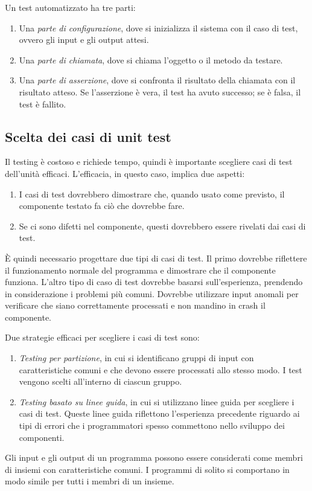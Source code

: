 Un test automatizzato ha tre parti:
\begin{enumerate}
    \item Una \textit{parte di configurazione}, dove si inizializza il sistema con il caso di test, ovvero gli input e gli output attesi.
    \item Una \textit{parte di chiamata}, dove si chiama l'oggetto o il metodo da testare.
    \item Una \textit{parte di asserzione}, dove si confronta il risultato della chiamata con il risultato atteso. Se l’asserzione è vera, il test ha avuto successo; se è falsa, il test è fallito.
\end{enumerate}

\subsection{Scelta dei casi di unit test}
Il testing è costoso e richiede tempo, quindi è importante scegliere casi di test dell’unità efficaci. L'efficacia, in questo caso, implica due aspetti:
\begin{enumerate}
    \item I casi di test dovrebbero dimostrare che, quando usato come previsto, il componente testato fa ciò che dovrebbe fare.
    \item Se ci sono difetti nel componente, questi dovrebbero essere rivelati dai casi di test.
\end{enumerate}
È quindi necessario progettare due tipi di casi di test. Il primo dovrebbe riflettere il funzionamento normale del programma e dimostrare che il componente funziona. L’altro tipo di caso di test dovrebbe basarsi sull’esperienza, prendendo in considerazione i problemi più comuni. Dovrebbe utilizzare input anomali per verificare che siano correttamente processati e non mandino in crash il componente.

Due strategie efficaci per scegliere i casi di test sono:
\begin{enumerate}
    \item \textit{Testing per partizione}, in cui si identificano gruppi di input con caratteristiche comuni e che devono essere processati allo stesso modo. I test vengono scelti all'interno di ciascun gruppo.
    \item \textit{Testing basato su linee guida}, in cui si utilizzano linee guida per scegliere i casi di test. Queste linee guida riflettono l’esperienza precedente riguardo ai tipi di errori che i programmatori spesso commettono nello sviluppo dei componenti.
\end{enumerate}
Gli input e gli output di un programma possono essere considerati come membri di insiemi con caratteristiche comuni. I programmi di solito si comportano in modo simile per tutti i membri di un insieme.

